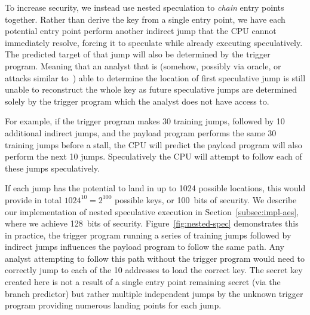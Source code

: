 To increase security, we instead use nested speculation to \emph{chain} entry
points together. Rather than derive the key from a single entry point, we have
each potential entry point perform another indirect jump that the CPU cannot
immediately resolve, forcing it to speculate while already executing
speculatively. The predicted target of that jump will also be determined by the
trigger program. Meaning that an analyst that is (somehow, possibly via oracle,
or attacks similar to~\cite{aciiccmez2007predicting}) able to determine the
location of first speculative jump is still unable to reconstruct the whole key
as future speculative jumps are determined solely by the trigger program which
the analyst does not have access to.

For example, if the trigger program makes 30 training jumps, followed by 10
additional indirect jumps, and the payload program performs the same 30 training
jumps before a stall, the CPU will predict the payload program will also perform
the next 10 jumps. Speculatively the CPU will attempt to follow each of these
jumps speculatively. 

If each jump has the potential to land in up to 1024 possible locations, this
would provide in total $1024^{10} = 2^{100}$ possible keys, or 100~bits of
security. We describe our implementation of nested speculative execution in
Section~\ref{subsec:impl-aes}, where we achieve 128~bits of security.
Figure~\ref{fig:nested-spec} demonstrates this in practice, the trigger program
running a series of training jumps followed by indirect jumps influences the
payload program to follow the same path. Any analyst attempting to follow this
path without the trigger program would need to correctly jump to each of the 10
addresses to load the correct key. The secret key created here is not a result
of a single entry point remaining secret (via the branch predictor) but rather
multiple independent jumps by the unknown trigger program providing numerous
landing points for each jump.

\FigNestedSpec


\medskip


%
%


